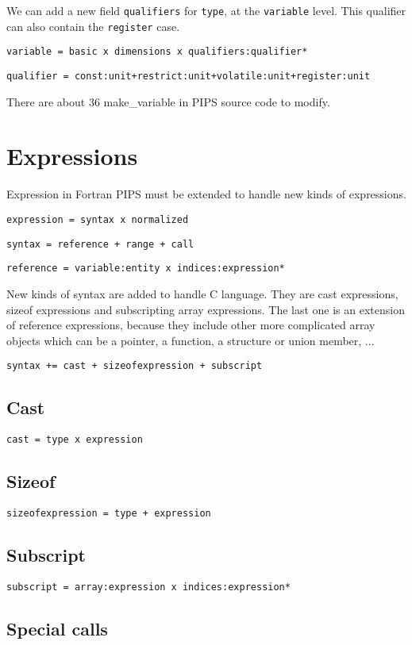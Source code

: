 \documentclass[a4paper]{article}
\begin{document}
We can add a new field \verb/qualifiers/ for \verb/type/, at the
\verb/variable/ level. This qualifier can also contain the \verb/register/ case.

\verb/variable = basic x dimensions x qualifiers:qualifier*/

\verb/qualifier = const:unit+restrict:unit+volatile:unit+register:unit/

There are about 36 make\_variable in PIPS source code to modify.

\newpage
\section{Expressions}

Expression in Fortran PIPS must be extended to handle new kinds of
expressions.

\verb/expression = syntax x normalized/

\verb/syntax = reference + range + call/

\verb/reference = variable:entity x indices:expression*/

New kinds of syntax are added to handle C language. They are cast
expressions, sizeof expressions and subscripting array expressions. The last
one is an extension of reference expressions, because they include other
more complicated array objects which can be a pointer, a function, a
structure or union member, ...   

\verb/syntax += cast + sizeofexpression + subscript/

\subsection{Cast}
\verb/cast = type x expression/

\subsection{Sizeof}
\verb/sizeofexpression = type + expression/

\subsection{Subscript}
\verb/subscript = array:expression x indices:expression*/

\subsection{Special calls }
\end{document}
